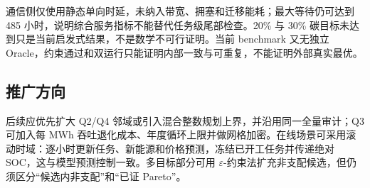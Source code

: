 \documentclass[withoutpreface,bwprint]{cumcmthesis}
\begin{document}
通信侧仅使用静态单向时延，未纳入带宽、拥塞和迁移能耗；最大等待仍可达到 485 小时，说明综合服务指标不能替代任务级尾部检查。20\% 与 30\% 碳目标未达到只是当前启发式结果，不是数学不可行证明。当前 benchmark 又无独立 Oracle，约束通过和双运行只能证明内部一致与可重复，不能证明外部真实最优。

\subsection{推广方向}
后续应优先扩大 Q2/Q4 邻域或引入混合整数规划上界，并沿用同一全量审计；Q3 可加入每 MWh 吞吐退化成本、年度循环上限并做网格加密。在线场景可采用滚动时域：逐小时更新任务、新能源和价格预测，冻结已开工任务并传递绝对 SOC，这与模型预测控制一致\cite{rawlings2017model}。多目标部分可用 $\varepsilon$-约束法扩充非支配候选\cite{miettinen1999nonlinear}，但仍须区分“候选内非支配”和“已证 Pareto”。




\end{document}
